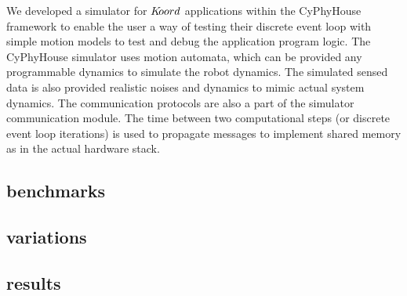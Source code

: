 We developed a simulator  for $K\kern-2pt oord$ applications within the CyPhyHouse framework to enable the user a way of testing their discrete event loop with simple motion models to test and debug the application program logic. The CyPhyHouse simulator uses motion automata, which can be provided any programmable dynamics to simulate the robot dynamics. The simulated sensed data is also provided realistic noises and dynamics to mimic actual system dynamics. The communication protocols are also a part of the simulator communication module. The time between two computational steps (or discrete event loop iterations) is used to propagate messages to implement shared memory as in the actual hardware stack.
\subsection{benchmarks}
\subsection{variations}
\subsection{results}